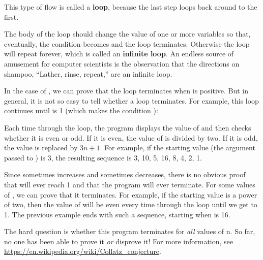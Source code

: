 
This type of flow is called a {\bf loop}, because the last step loops back around to the first.


The body of the loop should change the value of one or more variables so that, eventually, the condition becomes  and the loop terminates.
Otherwise the loop will repeat forever, which is called an {\bf infinite loop}.
An endless source of amusement for computer scientists is the observation that the directions on shampoo, ``Lather, rinse, repeat,'' are an infinite loop.

In the case of , we can prove that the loop terminates when  is positive.
But in general, it is not so easy to tell whether a loop terminates.
For example, this loop continues until  is 1 (which makes the condition ):


Each time through the loop, the program displays the value of  and then checks whether it is even or odd.
If it is even, the value of  is divided by two.
If it is odd, the value is replaced by $3n+1$.
For example, if the starting value (the argument passed to ) is 3, the resulting sequence is 3, 10, 5, 16, 8, 4, 2, 1.

Since  sometimes increases and sometimes decreases, there is no obvious proof that  will ever reach 1 and that the program will ever terminate.
For some values of , we can prove that it terminates.
For example, if the starting value is a power of two, then the value of  will be even every time through the loop until we get to 1.
The previous example ends with such a sequence, starting when  is 16.

The hard question is whether this program terminates for {\em all} values of n.
So far, no one has been able to prove it {\em or} disprove it!
For more information, see \url{https://en.wikipedia.org/wiki/Collatz_conjecture}.


